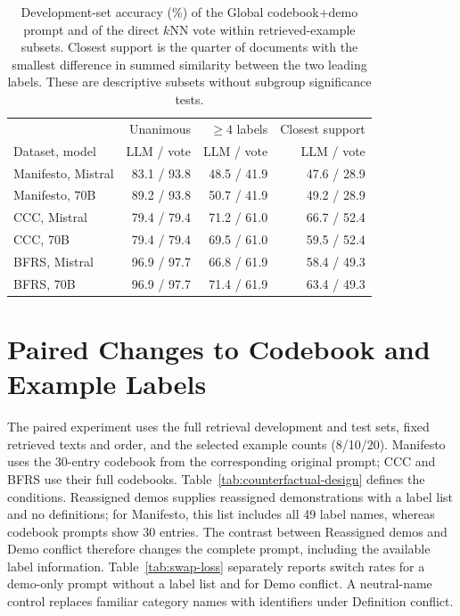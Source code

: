 \documentclass[11pt]{article}
\begin{document}
\begin{table}[!t]
\centering
\begin{tabular}{lrrr}
\toprule
 & Unanimous & $\geq 4$ labels & Closest support \\
Dataset, model & LLM / vote & LLM / vote & LLM / vote \\
\midrule
Manifesto, Mistral & 83.1 / 93.8 & 48.5 / 41.9 & 47.6 / 28.9 \\
Manifesto, 70B & 89.2 / 93.8 & 50.7 / 41.9 & 49.2 / 28.9 \\
CCC, Mistral & 79.4 / 79.4 & 71.2 / 61.0 & 66.7 / 52.4 \\
CCC, 70B & 79.4 / 79.4 & 69.5 / 61.0 & 59.5 / 52.4 \\
BFRS, Mistral & 96.9 / 97.7 & 66.8 / 61.9 & 58.4 / 49.3 \\
BFRS, 70B & 96.9 / 97.7 & 71.4 / 61.9 & 63.4 / 49.3 \\
\bottomrule
\end{tabular}
\caption{Development-set accuracy (\%) of the Global codebook+demo prompt and of the direct $k$NN vote within retrieved-example subsets. Closest support is the quarter of documents with the smallest difference in summed similarity between the two leading labels. These are descriptive subsets without subgroup significance tests.}
\label{tab:vote-subsets}
\end{table}


\section{Paired Changes to Codebook and Example Labels}
\label{app:paired}

The paired experiment uses the full retrieval development and test sets, fixed retrieved texts and order, and the selected example counts (8/10/20). Manifesto uses the 30-entry codebook from the corresponding original prompt; CCC and BFRS use their full codebooks. Table~\ref{tab:counterfactual-design} defines the conditions. Reassigned demos supplies reassigned demonstrations with a label list and no definitions; for Manifesto, this list includes all 49 label names, whereas codebook prompts show 30 entries. The contrast between Reassigned demos and Demo conflict therefore changes the complete prompt, including the available label information. Table~\ref{tab:swap-loss} separately reports switch rates for a demo-only prompt without a label list and for Demo conflict. A neutral-name control replaces familiar category names with identifiers under Definition conflict.
\end{document}
